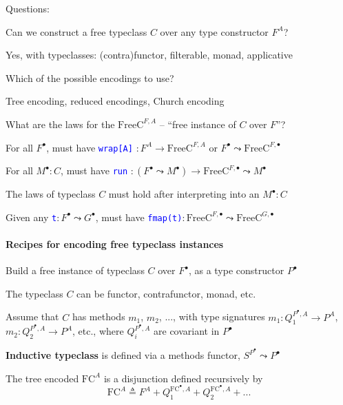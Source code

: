 Questions:

Can we construct a free typeclass $C$ over any type constructor $F^{A}$?

Yes, with typeclasses: (contra)functor, filterable, monad, applicative

Which of the possible encodings to use?

Tree encoding, reduced encodings, Church encoding

What are the laws for the{\footnotesize{} $\text{FreeC}^{F,A}$} –
\textsf{``}free instance of $C$ over $F$\textsf{''}?

For all $F^{\bullet}$, must have \texttt{\textcolor{blue}{\footnotesize{}wrap{[}A{]}}}
$:F^{A}\rightarrow\text{FreeC}^{F,A}$ or $F^{\bullet}\leadsto\text{FreeC}^{F,\bullet}$

For all $M^{\bullet}:C$, must have \texttt{\textcolor{blue}{\footnotesize{}run}}
$:\left(F^{\bullet}\leadsto M^{\bullet}\right)\rightarrow\text{FreeC}^{F,\bullet}\leadsto M^{\bullet}$

The laws of typeclass $C$ must hold after interpreting into an $M^{\bullet}:C$

Given any \texttt{\textcolor{blue}{\footnotesize{}t}}$:F^{\bullet}\leadsto G^{\bullet}$,
must have \texttt{\textcolor{blue}{\footnotesize{}fmap(t)}}$:\text{FreeC}^{F,\bullet}\leadsto\text{FreeC}^{G,\bullet}$


\paragraph{Recipes for encoding free typeclass instances}

Build a free instance of typeclass $C$ over $F^{\bullet}$, as a
type constructor $P^{\bullet}$ 

The typeclass $C$ can be functor, contrafunctor, monad, etc.

Assume that $C$ has methods $m_{1}$, $m_{2}$, ..., with type signatures
{\footnotesize{}$m_{1}:Q_{1}^{P^{\bullet},A}\rightarrow P^{A}$},
{\footnotesize{}$m_{2}:Q_{2}^{P^{\bullet},A}\rightarrow P^{A}$},
etc., where $Q_{i}^{P^{\bullet},A}$ are covariant in $P^{\bullet}$ 

\textbf{Inductive typeclass} is defined via a methods functor, $S^{P^{\bullet}}\leadsto P^{\bullet}$

The tree encoded $\text{FC}^{A}$ is a disjunction defined recursively
by{\footnotesize{}
\[
\text{FC}^{A}\triangleq F^{A}+Q_{1}^{\text{FC}^{\bullet},A}+Q_{2}^{\text{FC}^{\bullet},A}+...
\]
}{\footnotesize\par}

